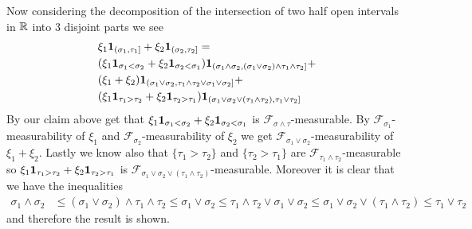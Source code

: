 Now considering the decomposition of the intersection of two half open intervals in $\mathbb{R}$ into 3 disjoint parts we see
\begin{align*}
&\xi_1 \textbf{1}_{(\sigma_1, \tau_1]} + \xi_2 \textbf{1}_{(\sigma_2, \tau_2]}  = \\
&(\xi_1 \textbf{1}_{\sigma_1 < \sigma_2} + \xi_2 \textbf{1}_{\sigma_2 < \sigma_1} ) \textbf{1}_{(\sigma_1 \wedge \sigma_2 , (\sigma_1 \vee \sigma_2) \wedge \tau_1 \wedge \tau_2]} + \\
&(\xi_1 + \xi_2) \textbf{1}_{(\sigma_1 \vee \sigma_2, \tau_1 \wedge \tau_2 \vee \sigma_1 \vee \sigma_2]} + \\
&(\xi_1 \textbf{1}_{\tau_1 > \tau_2} + \xi_2 \textbf{1}_{\tau_2 > \tau_1}) \textbf{1}_{(\sigma_1 \vee \sigma_2 \vee (\tau_1 \wedge \tau_2), \tau_1 \vee \tau_2 ]}
\end{align*}
By our claim above get that $\xi_1 \textbf{1}_{\sigma_1 < \sigma_2} + \xi_2 \textbf{1}_{\sigma_2 < \sigma_1}$ is $\mathcal{F}_{\sigma \wedge \tau}$-measurable.  By $\mathcal{F}_{\sigma_1}$-measurability of $\xi_1$ and $\mathcal{F}_{\sigma_2}$-measurability of $\xi_2$  we get $\mathcal{F}_{\sigma_1 \vee \sigma_2}$-measurability of $\xi_1 + \xi_2$.  Lastly we know also that $\lbrace \tau_1 > \tau_2 \rbrace$ and  $\lbrace \tau_2 > \tau_1 \rbrace$ are $\mathcal{F}_{\tau_1 \wedge \tau_2}$-measurable so $\xi_1 \textbf{1}_{\tau_1 > \tau_2} + \xi_2 \textbf{1}_{\tau_2 > \tau_1}$ is $\mathcal{F}_{\sigma_1 \vee \sigma_2 \vee (\tau_1 \wedge \tau_2)}$-measurable.  Moreover it is clear that we have the inequalities
\begin{align*}
\sigma_1 \wedge \sigma_2 &\leq (\sigma_1 \vee \sigma_2) \wedge \tau_1 \wedge \tau_2 \leq 
\sigma_1 \vee \sigma_2 \leq \tau_1 \wedge \tau_2 \vee \sigma_1 \vee \sigma_2 \leq 
\sigma_1 \vee \sigma_2 \vee (\tau_1 \wedge \tau_2) \leq \tau_1 \vee \tau_2
\end{align*}
and therefore the result is shown.

